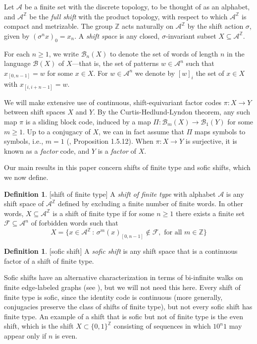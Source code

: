 \documentclass{amsproc}
\numberwithin{theorem}{section}
\theoremstyle{remark}
\theoremstyle{definition}
\newtheorem{defn}[theorem]{Definition}
\newcommand{\cA}{\mathcal{A}}
\newcommand{\cB}{\mathcal{B}}
\newcommand{\cF}{\mathcal{F}}
\newcommand{\Z}{\mathbb{Z}}
\theoremstyle{plain}
\begin{document}
Let $\cA$ be a finite set with the discrete topology, to be thought of as an alphabet, and $\cA^{\Z}$ be the \textit{full shift} with the product topology, with respect to which $\cA^{\Z}$ is compact and metrizable. The group $\Z$ acts naturally on $\cA^{\Z}$ by the shift action $\sigma$, given by $(\sigma^n x)_0 = x_n$. A \textit{shift space} is any closed, $\sigma$-invariant subset $X \subseteq \cA^{\Z}$. 

For each $n \geq 1$, we write $\cB_{n}(X)$ to denote the set of words of length $n$ in the language $\cB(X)$ of $X$---that is, the set of patterns $w \in \cA^{n}$ such that $x_{[0,n-1]} = w$ for some $x \in X$. For $w \in \cA^{n}$ we denote by $[w]_{i}$ the set of $x \in X$ with $x_{[i,i+n-1]} = w$.

We will make extensive use of continuous, shift-equivariant factor codes $\pi: X \to Y$ between shift spaces $X$ and $Y$. By the Curtis-Hedlund-Lyndon theorem, any such map $\pi$ is a sliding block code, induced by a map $\Pi: \cB_m(X) \to \cB_1(Y)$ for some $m \geq 1$. Up to a conjugacy of $X$, we can in fact assume that $\Pi$ maps symbols to symbols, i.e., $m=1$ (\cite{lind1995introduction}, Proposition 1.5.12). When $\pi: X \to Y$ is surjective, it is known as a \textit{factor} code, and $Y$ is a \textit{factor} of $X$. 

Our main results in this paper concern shifts of finite type and sofic shifts, which we now define.

\begin{defn}\label{SFT-shift}[shift of finite type]
A \textit{shift of finite type} with alphabet $\cA$ is any shift space of $\cA^{\Z}$ defined by excluding a finite number of finite words. In other words, $X \subseteq \cA^{\Z}$ is a shift of finite type if for some $n \geq 1$ there exists a finite set $\cF \subseteq \cA^n$ of forbidden words such that
\begin{equation*}
    X = \{x \in \mathcal{A}^{\Z} \,:\, \sigma^m(x)_{[0,n-1]} \notin \mathcal{F}, \mbox{ for all } m \in \Z\}
\end{equation*}
\end{defn}

\begin{defn}\label{sofic-shift}[sofic shift]
A \textit{sofic shift} is any shift space that is a continuous factor of a shift of finite type.
\end{defn}

Sofic shifts have an alternative characterization in terms of bi-infinite walks on finite edge-labeled graphs (see \cite{lind1995introduction}), but we will not need this here. Every shift of finite type is sofic, since the identity code is continuous (more generally, conjugacies preserve the class of shifts of finite type), but not every sofic shift has finite type. An example of a shift that is sofic but not of finite type is the even shift, which is the shift $X \subset \{ 0,1 \}^{\Z}$ consisting of sequences in which $10^n1$ may appear only if $n$ is even.
\end{document}

